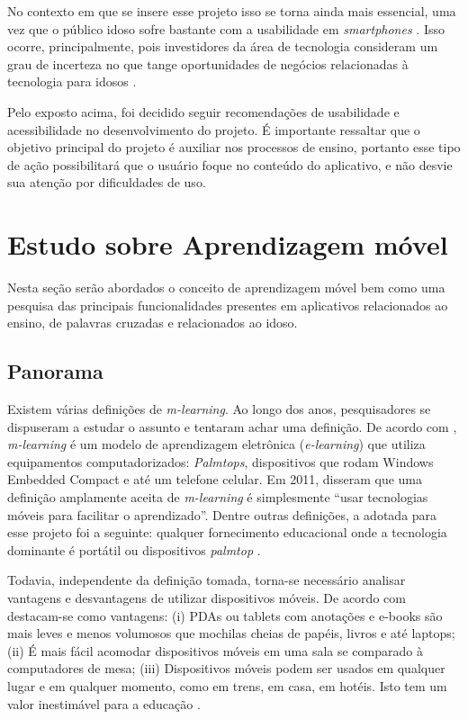 No contexto em que se insere esse projeto isso se torna ainda mais essencial, uma vez que o público idoso sofre bastante com a usabilidade em \textit{smartphones} \citep{dificuldadesIdosos}. Isso ocorre, principalmente, pois investidores da área de tecnologia consideram um grau de incerteza no que tange oportunidades de negócios relacionadas à tecnologia para idosos \citep{NBCelderly}.

Pelo exposto acima, foi decidido seguir recomendações de usabilidade e acessibilidade no desenvolvimento do projeto. É importante ressaltar que o objetivo principal do projeto é auxiliar nos processos de ensino, portanto esse tipo de ação possibilitará que o usuário foque no conteúdo do aplicativo, e não desvie sua atenção por dificuldades de uso.

\section{Estudo sobre Aprendizagem móvel}\label{sec:estudos_ap_movel} 
Nesta seção serão abordados o conceito de aprendizagem móvel bem como uma pesquisa das principais funcionalidades presentes em aplicativos relacionados ao ensino, de palavras cruzadas e relacionados ao idoso.

\subsection{Panorama}
Existem várias definições de \textit{m-learning}. Ao longo dos anos, pesquisadores se dispuseram a estudar o assunto e tentaram achar uma definição. De acordo com \cite{Quinn2000}, \textit{m-learning} é um modelo de aprendizagem eletrônica (\textit{e-learning}) que utiliza equipamentos computadorizados: \textit{Palmtops}, dispositivos que rodam Windows Embedded Compact e até um telefone celular.
Em 2011, \cite{hwang2011research} disseram que uma definição amplamente aceita de \textit{m-learning} é simplesmente ``usar tecnologias móveis para facilitar o aprendizado''. Dentre outras definições, a adotada para esse projeto foi a seguinte: qualquer fornecimento educacional onde a tecnologia dominante é portátil ou dispositivos \textit{palmtop} \citep{traxler2005defining}.

Todavia, independente da definição tomada, torna-se necessário analisar vantagens e desvantagens de utilizar dispositivos móveis. De acordo com \cite{RICHAMEHTA2016} destacam-se como vantagens: (i) PDAs ou tablets com anotações e e-books são mais leves e menos volumosos que mochilas cheias de papéis, livros e até laptops; (ii) É mais fácil acomodar dispositivos móveis em uma sala se comparado à computadores de mesa; (iii) Dispositivos móveis podem ser usados em qualquer lugar e em qualquer momento, como em trens, em casa, em hotéis. Isto tem um valor inestimável para a educação \citep{CarmaMaia2008}.

